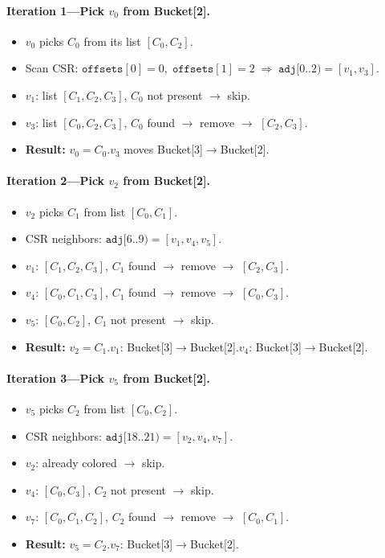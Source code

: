 \documentclass[11pt,letterpaper]{article}
\begin{document}
\paragraph{Iteration 1---Pick $v_0$ from Bucket[2].}
\begin{itemize}[nosep]
  \item $v_0$ picks $C_0$ from its list $[C_0, C_2]$.
  \item Scan CSR: $\texttt{offsets}[0]=0,\;\texttt{offsets}[1]=2 \;\Rightarrow\; \texttt{adj}[0..2) = [v_1, v_3]$.
  \item $v_1$: list $[C_1,C_2,C_3]$, $C_0$ not present $\rightarrow$ skip.
  \item $v_3$: list $[C_0,C_2,C_3]$, $C_0$ found $\rightarrow$ remove $\rightarrow$ $[C_2,C_3]$.
  \item \textbf{Result:} $v_0 = C_0$.\quad $v_3$ moves Bucket[3]$\to$Bucket[2].
\end{itemize}

\paragraph{Iteration 2---Pick $v_2$ from Bucket[2].}
\begin{itemize}[nosep]
  \item $v_2$ picks $C_1$ from list $[C_0, C_1]$.
  \item CSR neighbors: $\texttt{adj}[6..9) = [v_1, v_4, v_5]$.
  \item $v_1$: $[C_1,C_2,C_3]$, $C_1$ found $\rightarrow$ remove $\rightarrow$ $[C_2,C_3]$.
  \item $v_4$: $[C_0,C_1,C_3]$, $C_1$ found $\rightarrow$ remove $\rightarrow$ $[C_0,C_3]$.
  \item $v_5$: $[C_0,C_2]$, $C_1$ not present $\rightarrow$ skip.
  \item \textbf{Result:} $v_2 = C_1$.\quad $v_1$: Bucket[3]$\to$Bucket[2].\quad $v_4$: Bucket[3]$\to$Bucket[2].
\end{itemize}

\paragraph{Iteration 3---Pick $v_5$ from Bucket[2].}
\begin{itemize}[nosep]
  \item $v_5$ picks $C_2$ from list $[C_0, C_2]$.
  \item CSR neighbors: $\texttt{adj}[18..21) = [v_2, v_4, v_7]$.
  \item $v_2$: already colored $\rightarrow$ skip.
  \item $v_4$: $[C_0,C_3]$, $C_2$ not present $\rightarrow$ skip.
  \item $v_7$: $[C_0,C_1,C_2]$, $C_2$ found $\rightarrow$ remove $\rightarrow$ $[C_0,C_1]$.
  \item \textbf{Result:} $v_5 = C_2$.\quad $v_7$: Bucket[3]$\to$Bucket[2].
\end{itemize}
\end{document}
